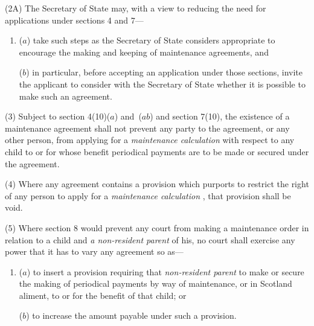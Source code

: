 \documentclass[12pt,a4paper]{article}
\begin{document}
(2A) The 
Secretary of State  %
may, with a view to reducing the need for applications under sections 4 and 7—
\begin{enumerate}\item[]
($a$) take such steps as 
the Secretary of State  %
considers appropriate to encourage the making and keeping of maintenance agreements, and

($b$) in particular, before accepting an application under those sections, invite the applicant to consider with the 
Secretary of State  %
whether it is possible to make such an agreement.
\end{enumerate}

(3) 
Subject to section 4(10)($a$) 
and~($ab$)  %
and section 7(10),  %
the existence of a maintenance agreement shall not prevent any party to the agreement, or any other person, from applying for a 
\emph{maintenance calculation}  %
with respect to any child to or for whose benefit periodical payments are to be made or secured under the agreement.

(4) Where any agreement contains a provision which purports to restrict the right of any person to apply for a 
\emph{maintenance calculation}%
, that provision shall be void.

(5) Where section 8 would prevent any court from making a maintenance order in relation to a child and 
\emph{a non-resident parent}  %
of his, no court shall exercise any power that it has to vary any agreement so as—
\begin{enumerate}\item[]
($a$) to insert a provision requiring that 
\emph{non-resident parent}  %
to make or secure the making of periodical payments by way of maintenance, or in Scotland aliment, to or for the benefit of that child; or

($b$) to increase the amount payable under such a provision.
\end{enumerate}
\end{document}
